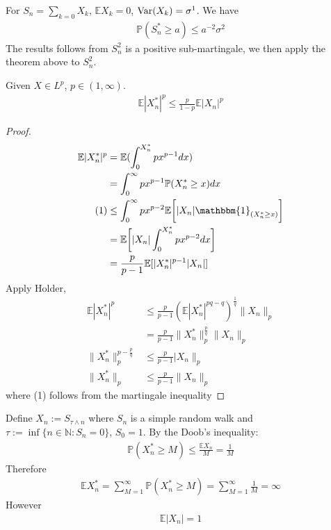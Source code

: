 \begin{example}
For $S_n = \sum_{k = 0} X_k$, $\mathbb{E}X_k = 0$, $\operatorname{Var}(X_k) = \sigma^1$. We have
\begin{align*}
	\mathbb{P}(S^*_n \ge  a) \le a^{-2} \sigma^2
\end{align*}	
The results follows from $S^2_n$ is a positive sub-martingale, we then apply the theorem above to $S_n^2$.
\end{example}

\begin{theorem}
	Given $X \in L^p$, $p \in (1, \infty)$.
	\begin{align*}
		\mathbb{E}|X^*_n|^p \leq \frac{p}{1-p} \mathbb{E}|X_n|^p
	\end{align*}
\end{theorem}
\begin{proof}
	\begin{align*}
		\mathbb{E}|X_n^*|^p &= \mathbb{E}( \int_0^{X^*_n} px^{p-1} dx) \\
		&= \int_0^\infty px^{p-1} \mathbb{P}(X_n^* \ge x )dx\\
	(1)	&\leq \int_0^\infty px ^{p-2}  \mathbb{E}\bigg[|X_n| \mathbbm{1}_{(X_n^* \ge x)}\bigg]\\
		&= \mathbb{E}\bigg[ |X_n| \int_0^{X_n^*} px^{p-2}dx\bigg] \\
		&= \frac{p}{p-1}\mathbb{E}[|X_n^*|^{p-1}|X_n|]
	\end{align*}
	Apply Holder, 
	\begin{align*}
	\mathbb{E}|X_n^*|^p &\le  \frac{p}{p-1} (\mathbb{E}|X_n^*|^{pq - q})^{\frac{1}{q}} \|X_n\|_p\\
	&= \frac{p}{p-1} \|X_n^*\|_p^\frac{p}{q} \|X_n \|_p\\
	\|X_n^*\|_p^{p - \frac{p}{q}} &\leq \frac{p}{p-1}|X_n\|_p\\
	\|X_n^*\|_p &\leq \frac{p}{p-1}\|X_n\|_p
	\end{align*}
	where (1) follows from the martingale inequality
\end{proof}

\begin{example}[The $L^p$ inequality fails when $p = 1$]
Define $X_n:= S_{\tau \wedge n}$ where $S_n$ is a simple random walk and $\tau:= \inf \{n \in \mathbb{N} : S_n = 0 \} $, $S_0 = 1$. By the Doob's inequality:
\begin{align*}
	\mathbb{P}(X_n^* \geq M ) \le \frac{\mathbb{E}X_n}{M} = \frac{1}{M}
\end{align*}
Therefore
\begin{align*}
	\mathbb{E}X_n^* = \sum_{M = 1}^\infty \mathbb{P}(X_n^* \ge M) = \sum_{M = 1}^\infty \frac{1}{M} = \infty
\end{align*}
However
\begin{align*}
	\mathbb{E}|X_n| = 1
\end{align*}
\end{example}

